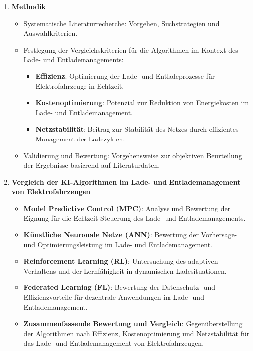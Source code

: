 \documentclass[12pt]{article} %
\begin{document}
\begin{enumerate}
    \item \textbf{Methodik}
        \begin{itemize}
            \item Systematische Literaturrecherche: Vorgehen, Suchstrategien und Auswahlkriterien.
            \item Festlegung der Vergleichskriterien für die Algorithmen im Kontext des Lade- und Entlademanagements:
                \begin{itemize}
                    \item \textbf{Effizienz}: Optimierung der Lade- und Entladeprozesse für Elektrofahrzeuge in Echtzeit.
                    \item \textbf{Kostenoptimierung}: Potenzial zur Reduktion von Energiekosten im Lade- und Entlademanagement.
                    \item \textbf{Netzstabilität}: Beitrag zur Stabilität des Netzes durch effizientes Management der Ladezyklen.
                \end{itemize}
            \item Validierung und Bewertung: Vorgehensweise zur objektiven Beurteilung der Ergebnisse basierend auf Literaturdaten.
        \end{itemize}
        
    \item \textbf{Vergleich der KI-Algorithmen im Lade- und Entlademanagement von Elektrofahrzeugen}
        \begin{itemize}
            \item \textbf{Model Predictive Control (MPC)}: Analyse und Bewertung der Eignung für die Echtzeit-Steuerung des Lade- und Entlademanagements.
            \item \textbf{Künstliche Neuronale Netze (ANN)}: Bewertung der Vorhersage- und Optimierungsleistung im Lade- und Entlademanagement.
            \item \textbf{Reinforcement Learning (RL)}: Untersuchung des adaptiven Verhaltens und der Lernfähigkeit in dynamischen Ladesituationen.
            \item \textbf{Federated Learning (FL)}: Bewertung der Datenschutz- und Effizienzvorteile für dezentrale Anwendungen im Lade- und Entlademanagement.
            \item \textbf{Zusammenfassende Bewertung und Vergleich}: Gegenüberstellung der Algorithmen nach Effizienz, Kostenoptimierung und Netzstabilität für das Lade- und Entlademanagement von Elektrofahrzeugen.
        \end{itemize}
        

\end{enumerate}
\end{document}
